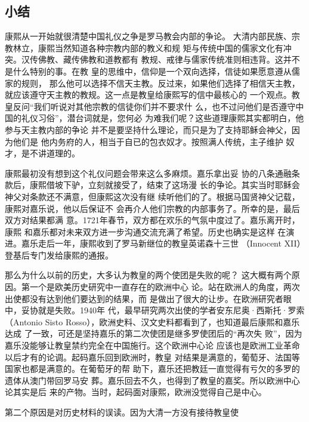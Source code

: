 \subsection{小结}
\par
康熙从一开始就很清楚中国礼仪之争是罗马教会内部的争论。%
大清内部民族、宗教林立，康熙当然知道各种宗教内部的教义和规%
矩与传统中国的儒家文化有冲突。汉传佛教、藏传佛教和道教都有%
教规、戒律与儒家传统准则相违背。这并不是什么特别的事。在教%
皇的思维中，信仰是一个双向选择，信徒如果愿意遵从儒家的规则，%
那么他可以选择不信天主教。反过来，如果他们选择了相信天主教，%
就应该遵守天主教的教规。这一点是教皇给康熙写的信中最核心的%
一个观点。教皇反问“我们听说对其他宗教的信徒你们并不要求什%
么，也不过问他们是否遵守中国的礼仪习俗”，潜台词就是，您何必%
为难我们呢？这些道理康熙其实都明白，他参与天主教内部的争论%
并不是要坚持什么理论，而只是为了支持耶稣会神父，因为他们是%
他内务府的人，相当于自已的包衣奴才。按照满人传统，主子维护%
奴才，是不讲道理的。%
\par
康熙最初没有想到这个礼仪问题会带来这么多麻烦。嘉乐拿出妥%
协的八条通融条款后，康熙借坡下驴，立刻就接受了，结束了这场漫%
长的争论。其实当时耶稣会神父对条款还不满意，但康熙这次没有继%
续听他们的了。根据马国贤神父记载，康熙对嘉乐说，他以后保证不%
会再介人他们宗教的内部事务了。所幸的是，最后双方对结果都满%
意。1721年春节，双方都在欢乐的气氛中度过了。嘉乐离开时，康熙%
和嘉乐都对未来双方进一步沟通交流充满了希望。历史也确实是这样%
在演进。嘉乐走后一年，康熙收到了罗马新继位的教皇英诺森十三世%
（Innocent XII）登基后专门发给康熙的通报。%
\par
那么为什么以前的历史，大多认为教皇的两个使团是失败的呢？%
这大概有两个原因。第一个是欧美历史研究中一直存在的欧洲中心%
论。站在欧洲人的角度，两次出使都没有达到他们要达到的结果，而%
是做出了很大的让步。在欧洲研究者眼中，妥协就是失败。1940年%
代，最早研究两次出使的学者安东尼奥·西斯托·罗索（Antonio Sisto%
\space%
Rosso），欧洲史料、汉文史料都看到了，也知道最后康熙和嘉乐达成%
了一致，可还是坚持嘉乐的第二次使团是继多罗使团后的“再次失%
败”，因为嘉乐没能够让教皇禁约完全在中国施行。这个欧洲中心论%
应该也是欧洲工业革命以后才有的论调。起码嘉乐回到欧洲时，教皇%
对结果是满意的，葡萄牙、法国等国家也都是满意的。在葡萄牙的帮%
助下，嘉乐还把教廷一直觉得有亏欠的多罗的遗体从澳门带回罗马安%
葬。嘉乐回去不久，也得到了教皇的嘉奖。所以欧洲中心论其实是后%
来的产物。当时，起码面对康熙，欧洲没觉得自己是中心。%
\par
第二个原因是对历史材料的误读。因为大清一方没有接待教皇使%
